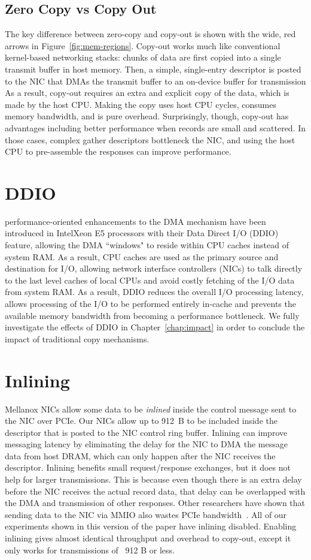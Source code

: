 \subsection{Zero Copy vs Copy Out}
The key difference between zero-copy and copy-out is shown with the wide, red
arrows in Figure~\ref{fig:mem-regions}. Copy-out works much like conventional
kernel-based networking stacks: chunks of data are first copied into a single
transmit buffer in host memory. Then, a simple, single-entry descriptor is
posted to the NIC that DMAs the transmit buffer to an on-device buffer for transmission
As a result, copy-out requires an extra and explicit copy of the data, which is made
by the host CPU.  Making the copy uses host CPU cycles, consumes memory
bandwidth, and is pure overhead. Surprisingly, though, copy-out has
advantages including better performance when
records are small and scattered.  In those cases, complex gather descriptors
bottleneck the NIC, and using the host CPU to pre-assemble the responses can
improve performance.



\section{DDIO}
performance-oriented enhancements to the DMA mechanism have been introduced in 
Intel\textregistered Xeon E5 processors with their Data Direct I/O (DDIO)~\cite{ddio} feature,
allowing the DMA ``windows" to reside within CPU caches instead of system RAM. As a result,
CPU caches are used as the primary source and destination for I/O, 
allowing network interface controllers (NICs) to talk directly to the last level caches of local CPUs
and avoid costly fetching of the I/O data from system RAM. As a result,
DDIO reduces the overall I/O processing latency, allows processing of the I/O 
to be performed entirely in-cache and prevents the available memory bandwidth from becoming a performance bottleneck.
We fully investigate the effects of DDIO in Chapter~\ref{chap:impact} in order to conclude the impact of 
traditional copy mechanisms.


\section{Inlining}
Mellanox NICs allow some data to be {\em inlined} inside the control message
sent to the NIC over PCIe. Our NICs allow up to 912~B to be included inside the
descriptor that is posted to the NIC control ring buffer.  Inlining can improve
messaging latency by eliminating the delay for the NIC to DMA the message data
from host DRAM, which can only happen after the NIC receives the descriptor.
Inlining benefits small request/response exchanges, but it does not help for
larger transmissions. This is because even though there is an extra delay
before the NIC receives the actual record data, that delay can be overlapped
with the DMA and transmission of other responses. Other researchers have shown
that sending data to the NIC via MMIO also wastes PCIe bandwidth~\cite{rdma}.
All of our experiments shown in this version of the paper have inlining disabled. 
Enabling inlining gives almost identical throughput and overhead to copy-out, except it only
works for transmissions of ~912 B or less.

